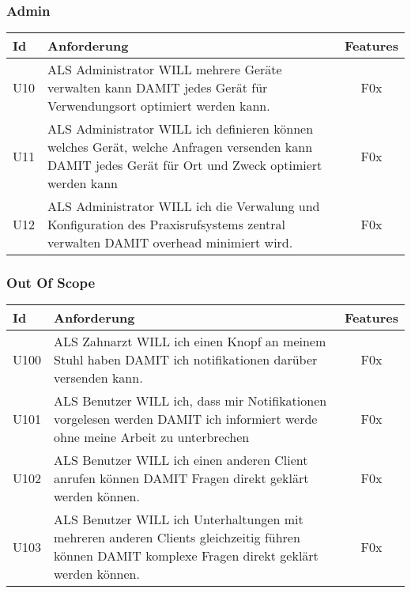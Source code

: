 \subsubsection*{Admin}

\begin{table}[h]
    \centering
    \begin{tabular}{|l|p{13cm}|c|}
        \hline
        \textbf{Id} & \textbf{Anforderung}                                                                                                                                 & \textbf{Features} \\
        \hline
        U10         & ALS Administrator WILL mehrere Geräte verwalten kann DAMIT jedes Gerät für Verwendungsort optimiert werden kann. & F0x \\
        \hline
        U11         & ALS Administrator WILL ich definieren können welches Gerät, welche Anfragen versenden kann DAMIT jedes Gerät für Ort und Zweck optimiert werden kann & F0x \\
        \hline
        U12         & ALS Administrator WILL ich die Verwalung und Konfiguration des Praxisrufsystems zentral verwalten DAMIT overhead minimiert wird. & F0x \\
        \hline
    \end{tabular}\label{tab:userstories2}
\end{table}

\subsubsection*{Out Of Scope}

\begin{table}[h]
    \centering
    \begin{tabular}{|l|p{13cm}|c|}
        \hline
        \textbf{Id} & \textbf{Anforderung}                                                                                                                                 & \textbf{Features} \\
        \hline
        U100         & ALS Zahnarzt WILL ich einen Knopf an meinem Stuhl haben DAMIT ich notifikationen darüber versenden kann. & F0x \\
        \hline
        U101         & ALS Benutzer WILL ich, dass mir Notifikationen vorgelesen werden DAMIT ich informiert werde ohne meine Arbeit zu unterbrechen & F0x \\
        \hline
        U102         & ALS Benutzer WILL ich einen anderen Client anrufen können DAMIT Fragen direkt geklärt werden können. & F0x \\
        \hline
        U103         & ALS Benutzer WILL ich Unterhaltungen mit mehreren anderen Clients gleichzeitig führen können DAMIT komplexe Fragen direkt geklärt werden können. & F0x \\
        \hline
    \end{tabular}\label{tab:userstories3}
\end{table}

